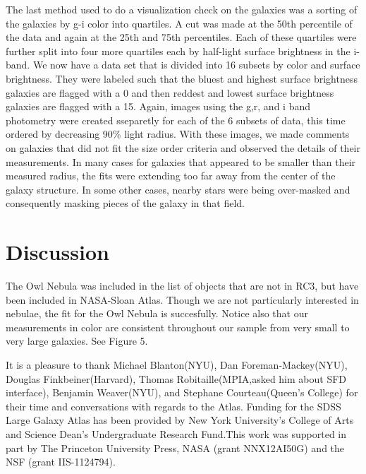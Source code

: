 \documentclass[12pt,preprint,pdftex]{aastex}
\begin{document}
The last method used to do a visualization check on the galaxies was a sorting of the galaxies by g-i color into quartiles. A cut was made at the 50th percentile of the data and again at the 25th and 75th percentiles. Each of these quartiles were further split into four more quartiles each by half-light surface brightness in the i-band. We now have a data set that is divided into 16 subsets by color and surface brightness. They were labeled such that the bluest and highest surface brightness galaxies are flagged with a 0 and then reddest and lowest surface brightness galaxies are flagged with a 15. Again, images using the g,r, and i band photometry were created sseparetly for each of the 6 subsets of data, this time ordered by decreasing 90\% light radius. With these images, we made comments on galaxies that did not fit the size order criteria and observed the details of their measurements. In many cases for galaxies that appeared to be smaller than their measured radius, the fits were extending too far away from the center of the galaxy structure. In some other cases, nearby stars were being over-masked and consequently masking pieces of the galaxy in that field. 





\section{Discussion}

The Owl Nebula was included in the list of objects that are not in RC3, but have been included in NASA-Sloan Atlas. Though we are not particularly interested in nebulae, the fit for the Owl Nebula is succesfully. Notice also that our measurements in color are consistent throughout our sample from very small to very large galaxies. See Figure 5. 


\acknowledgements
It is a pleasure to thank Michael Blanton(NYU), Dan Foreman-Mackey(NYU), Douglas Finkbeiner(Harvard), Thomas Robitaille(MPIA,asked him about SFD interface), Benjamin Weaver(NYU), and Stephane Courteau(Queen's College) for their time and conversations with regards to the Atlas. Funding for the SDSS Large Galaxy Atlas has been provided by New York University's College of Arts and Science Dean's Undergraduate Research Fund.This work was supported in part by The Princeton University Press,
NASA (grant NNX12AI50G) and the NSF (grant IIS-1124794).
\end{document}
